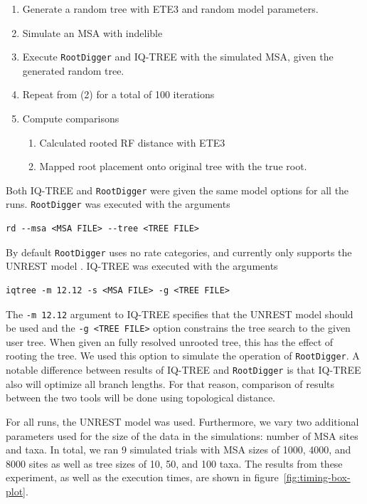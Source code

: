 \documentclass{article}
\newcommand{\RootDiggertt}{\texttt{RootDigger}}
\begin{document}
\begin{enumerate} 
  \item Generate a random tree with ETE3
        \cite{huerta-cepas_ete_2016} and random model parameters.
  \item Simulate an MSA with indelible \cite{fletcher_indelible:_2009}
  \item Execute \RootDiggertt{} and IQ-TREE \cite{minh_iq-tree_2019} with the
    simulated MSA, given the generated random tree.
  \item Repeat from (2) for a total of 100 iterations
  \item Compute comparisons
        \begin{enumerate}
          \item Calculated rooted RF distance with ETE3
                \cite{robinson_comparison_1981}
          \item Mapped root placement onto original tree with the true root.
        \end{enumerate}
\end{enumerate}

Both IQ-TREE and \RootDiggertt{} were given the same model options for all the
runs. \RootDiggertt{} was executed with the arguments

\begin{verbatim}
rd --msa <MSA FILE> --tree <TREE FILE>
\end{verbatim}

By default \RootDiggertt{} uses no rate categories, and currently only supports
the UNREST model \cite{yang_estimating_1994}. IQ-TREE was executed with the
arguments

\begin{verbatim}
iqtree -m 12.12 -s <MSA FILE> -g <TREE FILE>
\end{verbatim}

The \texttt{-m 12.12} argument to IQ-TREE specifies that the UNREST model should
be used \cite{woodhams_new_2015} and the \texttt{-g <TREE FILE>} option
constrains the tree search to the given user tree. When given an fully resolved
unrooted tree, this has the effect of rooting the tree. We used this option to
simulate the operation of \RootDiggertt{}. A notable difference between results
of IQ-TREE and \RootDiggertt{} is that IQ-TREE also will optimize all branch
lengths. For that reason, comparison of results between the two tools will be
done using topological distance.

For all runs, the UNREST model was used. Furthermore, we vary two additional
parameters used for the size of the data in the simulations: number of MSA sites
and taxa.  In total, we ran 9 simulated trials with MSA sizes of 1000, 4000, and
8000 sites as well as tree sizes of 10, 50, and 100 taxa. The results from these
experiment, as well as the execution times, are shown in
figure~\ref{fig:timing-box-plot}.
\end{document}
